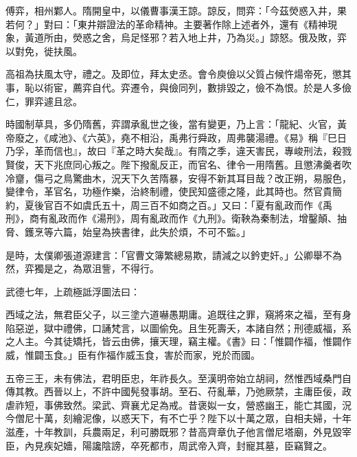 
\begin{pinyinscope}

 傅弈，相州鄴人。隋開皇中，以儀曹事漢王諒。諒反，問弈：「今茲熒惑入井，果若何？」對曰：「東井辯證法的革命精神。主要著作除上述者外，還有《精神現象，黃道所由，熒惑之舍，烏足怪邪？若入地上井，乃為災。」諒怒。俄及敗，弈以對免，徙扶風。



 高祖為扶風太守，禮之。及即位，拜太史丞。會令庾儉以父質占候忤煬帝死，懲其事，恥以術宦，薦弈自代。弈遷令，與儉同列，數排毀之，儉不為恨。於是人多儉仁，罪弈遽且忿。



 時國制草具，多仍隋舊，弈謂承亂世之後，當有變更，乃上言：「龍紀、火官，黃帝廢之，《咸池》、《六英》，堯不相沿，禹弗行舜政，周弗襲湯禮。《易》稱『巳日乃孚，革而信也』，故曰『革之時大矣哉』。有隋之季，違天害民，專峻刑法，殺戮賢俊，天下兆庶同心叛之。陛下撥亂反正，而官名、律令一用隋舊。且懲沸羹者吹冷齏，傷弓之鳥驚曲木，況天下久苦隋暴，安得不新其耳目哉？改正朔，易服色，變律令，革官名，功極作樂，治終制禮，使民知盛德之隆，此其時也。然官貴簡約，夏後官百不如虞氏五十，周三百不如商之百。」又曰：「夏有亂政而作《禹刑》，商有亂政而作《湯刑》，周有亂政而作《九刑》。衛鞅為秦制法，增鑿顛、抽脅、鑊烹等六篇，始皇為挾書律，此失於煩，不可不監。」



 是時，太僕卿張道源建言：「官曹文簿繁總易欺，請減之以鈐吏奸。」公卿舉不為然，弈獨是之，為眾沮訾，不得行。



 武德七年，上疏極詆浮圖法曰：



 西域之法，無君臣父子，以三塗六道嚇愚期庸。追既往之罪，窺將來之福，至有身陷惡逆，獄中禮佛，口誦梵言，以圖偷免。且生死壽夭，本諸自然；刑德威福，系之人主。今其徒矯托，皆云由佛，攘天理，竊主權。《書》曰：「惟闢作福，惟闢作威，惟闢玉食。」臣有作福作威玉食，害於而家，兇於而國。



 五帝三王，未有佛法，君明臣忠，年祚長久。至漢明帝始立胡祠，然惟西域桑門自傳其教。西晉以上，不許中國髡發事胡。至石、苻亂華，乃弛厥禁，主庸臣佞，政虐祚短，事佛致然。梁武、齊襄尤足為戒。昔褒姒一女，營惑幽王，能亡其國，況今僧尼十萬，刻繪泥像，以惑天下，有不亡乎？陛下以十萬之眾，自相夫婦，十年滋產，十年教訓，兵農兩足，利可勝既邪？昔高齊章仇子他言僧尼塔廟，外見毀宰臣，內見疾妃嬙，陽讒陰謗，卒死都市，周武帝入齊，封寵其墓，臣竊賢之。




\end{pinyinscope}
